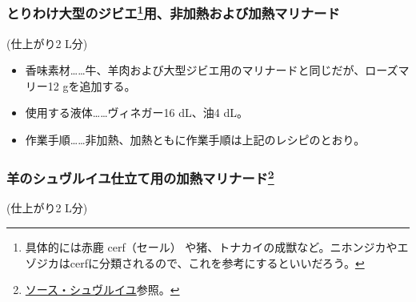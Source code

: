 \begin{recette}
\atoaki{}

\hypertarget{marinade-crue-ou-cuite-pour-grosse-venaison}{%
\subsubsection[とりわけ大型のジビエ用、非加熱および加熱マリナード]{\texorpdfstring{とりわけ大型のジビエ\footnote{具体的には赤鹿
  cerf（セール）
  や猪、トナカイの成獣など。ニホンジカやエゾジカはcerfに分類されるので、これを参考にするといいだろう。}用、非加熱および加熱マリナード}{とりわけ大型のジビエ用、非加熱および加熱マリナード}}\label{marinade-crue-ou-cuite-pour-grosse-venaison}}



(仕上がり2 L分)

\begin{itemize}
\item
  香味素材\ldots{}\ldots{}牛、羊肉および大型ジビエ用のマリナードと同じだが、ローズマリー12
  gを追加する。
\item
  使用する液体\ldots{}\ldots{}ヴィネガー16 dL、油4 dL。
\item
  作業手順\ldots{}\ldots{}非加熱、加熱ともに作業手順は上記のレシピのとおり。
\end{itemize}

\atoaki{}

\hypertarget{marinade-cuite-pour-le-mouton-en-chevreuil}{%
\subsubsection[羊のシュヴルイユ仕立て用の加熱マリナード]{\texorpdfstring{羊のシュヴルイユ仕立て用の加熱マリナード\footnote{\protect\hyperlink{sauce-chevreuil}{ソース・シュヴルイユ}参照。}}{羊のシュヴルイユ仕立て用の加熱マリナード}}\label{marinade-cuite-pour-le-mouton-en-chevreuil}}



(仕上がり2 L分)


\end{recette}
